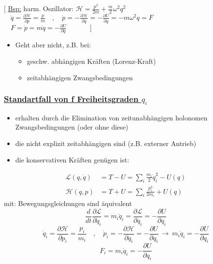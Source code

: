 \documentclass[titlepage,12pt,a4paper,ngerman]{report}
\newcommand{\lag}{\mathcal{L}}
\newcommand{\ham}{\mathcal{H}}
\begin{document}
{\begin{equation*}
\end{equation*}
$\bigg[$ \underline{Bsp:} harm. Oszillator: $ \ham = \frac{p^2}{2 m} + \frac{m}{2} \omega^2 q^2 $\\
$\phantom{\quad} \dot{q} = \frac{\partial \ham}{\partial p} = \frac{p}{m} \quad , \quad \dot{p} = - \frac{\partial \ham}{\partial q} = - \frac{\partial U}{\partial q} = - m \omega^2 q = F$\\
$\phantom{\quad} F = \dot{p} = m \ddot{q} = - \frac{\partial U}{\partial q} \qquad \quad \ \: \bigg] $
\begin{itemize}
	\item Geht aber nicht, z.B. bei:
	\begin{itemize}
		\item geschw. abhängigen Kräften (Lorenz-Kraft)
		\item zeitabhängigen Zwangsbedingungen
	\end{itemize}
\end{itemize}
\subsubsection{\underline{Standartfall von f Freiheitsgraden $ q_i $}}
\begin{itemize}
	\item erhalten durch die Elimination von zeitunabhängigen holonomen Zwangsbedingungen (oder ohne diese)
	\item die nicht explizit zeitabhängigen sind (z.B. externer Antrieb)
	\item die konservativen Kräften genügen ist:
\end{itemize}
\begin{align*}
\lag(q,\dot{q}) &= T  - U = \sum_i \frac{m_i}{2} \dot{q}^2_i - U(q)\\
\ham(q,p) &= T + U = \sum_i \frac{p_i^2}{2 m_i} + U(q)
\end{align*}
mit: Bewegungsgleichungen sind äquivalent
$$ \frac{d}{dt} \frac{\partial \lag}{\partial \dot{q}_i} = m_i \ddot{q}_i = \frac{\partial \lag}{\partial q_i} = - \frac{\partial U}{\partial q_i} $$
$$ \dot{q}_i = \frac{\partial \ham}{\partial p_i} = \frac{p_i}{m_i} \quad , \quad \dot{p}_i = - \frac{\partial \ham}{\partial q_i} = - \frac{\partial U}{\partial q_i} \ \rightarrow \ m_i \ddot{q}_i = - \frac{\partial U}{\partial q_i}$$
$$F_i = m_i \ddot{q}_i = -\frac{\partial U}{\partial q_i}$$
}
\end{document}

